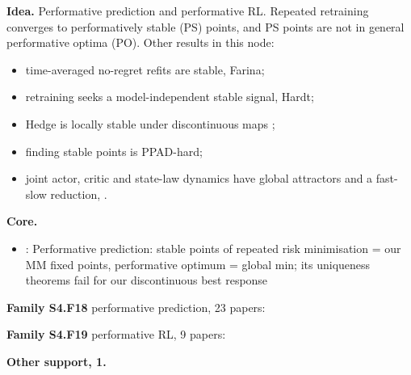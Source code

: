 \documentclass[10pt]{article}
\newcommand{\memb}[1]{\par\smallskip\textbf{#1}\quad}
\begin{document}
\textbf{Idea.} Performative prediction and performative RL. Repeated retraining converges to performatively stable (PS) points, and PS points are not in general performative optima (PO). Other results in this node:
\begin{itemize}[nosep,leftmargin=1.2em]
\item time-averaged no-regret refits are stable, Farina;
\item retraining seeks a model-independent stable signal, Hardt;
\item Hedge is locally stable under discontinuous maps \citep{Mandal-local26};
\item finding stable points is PPAD-hard;
\item joint actor, critic and state-law dynamics have global attractors and a fast-slow reduction, \citet{Prytula-global26}.
\end{itemize}


\memb{Core.}
\begin{itemize}[nosep,leftmargin=1.2em]
\item \citet{Perdomo-performative20}: Performative prediction: stable points of repeated risk minimisation = our MM fixed points, performative optimum = global min; its uniqueness theorems fail for our discontinuous best response
\end{itemize}
\memb{Family S4.F18} performative prediction, 23 papers: {\footnotesize \citetext{\citealp{Perdomo-performative20}; \citealp{Miller-outside21}; \citealp{Dean-emergent22}; \citealp{Farina-stability26}; \citealp{Hardt-retraining26}; \citealp{Mendler-stochastic20}; \citealp{Izzo-how21}; \citealp{Brown-performative22}; \citealp{Dean-preference22}; \citealp{Izzo-how22}; \citealp{Drusvyatskiy-stochastic23}; \citealp{Hardt-performative23}; \citealp{Narang-multiplayer23}; \citealp{Piliouras-multiagent23}; \citealp{Khorsandi-tight24}; \citealp{Li-stochastic24}; \citealp{Rodemann-reciprocal24}; \citealp{He-decisiondependent25}; \citealp{Hikima-zerothorder25}; \citealp{Zhong-nonlinear25}; \citealp{Zhong-towards25}; \citealp{Anagnostides-computational26}; \citealp{Kehrenberg-dissecting26}}}

\memb{Family S4.F19} performative RL, 9 papers: {\footnotesize \citetext{\citealp{Mandal-performative23}; \citealp{Mandal-local26}; \citealp{Cai-performative24}; \citealp{Rank-performative24}; \citealp{Basu-performative25}; \citealp{Chen-achieve25}; \citealp{Mandal-performative24}; \citealp{Pollatos-corruption25}; \citealp{Sahitaj-independent25}}}

\memb{Other support, 1.} \citetext{\citealp{Prytula-global26}}
\end{document}
